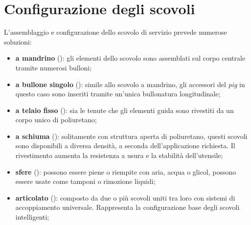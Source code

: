 \section{Configurazione degli scovoli}
L'assemblaggio e configurazione dello scovolo di servizio prevede numerose soluzioni:
\begin{itemize}
	\item \textbf{a mandrino} (): gli elementi dello scovolo sono assemblati sul corpo centrale tramite numerosi bulloni;
	\item \textbf{a bullone singolo} (): simile allo scovolo a mandrino, gli accessori del \textit{pig} in questo caso sono inseriti tramite un'unica bullonatura longitudinale;
	\item \textbf{a telaio fisso} (): sia le tenute che gli elementi guida sono rivestiti da un corpo unico di poliuretano;
	\item \textbf{a schiuma} (): solitamente con struttura aperta di poliuretano, questi scovoli sono disponibili a diversa densità, a seconda dell'applicazione richiesta. Il rivestimento aumenta la resistenza a usura e la stabilità dell'utensile;
	\item \textbf{sfere} (): possono essere piene o riempite con aria, acqua o glicol, possono essere usate come tamponi o rimozione liquidi;
	\item \textbf{articolato} (): composto da due o più scovoli uniti tra loro con sistemi di accoppiamento universale. Rappresenta la configurazione base degli scovoli intelligenti;

\end{itemize}

